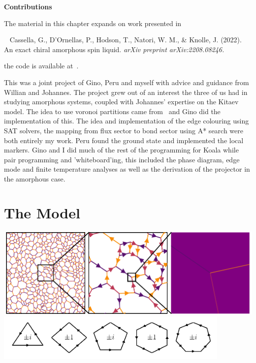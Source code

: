 \textbf{Contributions}

The material in this chapter expands on work presented in

~\autocite{cassellaExactChiralAmorphous2022} Cassella, G., D'Ornellas, P., Hodson, T., Natori, W. M., \& Knolle, J. (2022). An exact chiral amorphous spin liquid. \emph{arXiv preprint arXiv:2208.08246.}

the code is available at~\autocite{hodsonKoalaKitaevAmorphous2022}.

This was a joint project of Gino, Peru and myself with advice and guidance from Willian and Johannes. The project grew out of an interest the three of us had in studying amorphous systems, coupled with Johannes' expertise on the Kitaev model. The idea to use voronoi partitions came from~\autocite{marsalTopologicalWeaireThorpe2020} and Gino did the implementation of this. The idea and implementation of the edge colouring using SAT solvers, the mapping from flux sector to bond sector using A* search were both entirely my work. Peru found the ground state and implemented the local markers. Gino and I did much of the rest of the programming for Koala while pair programming and 'whiteboard'ing, this included the phase diagram, edge mode and finite temperature analyses as well as the derivation of the projector in the amorphous case.

\hypertarget{amk-Model}{%
\section{The Model}\label{amk-Model}}

\includegraphics[width=1\textwidth,height=\textheight]{figure_code/amk_chapter/intro/amk_zoom/amk_zoom} \includegraphics[width=0.86\textwidth,height=\textheight]{figure_code/amk_chapter/intro/regular_plaquettes/regular_plaquettes}


